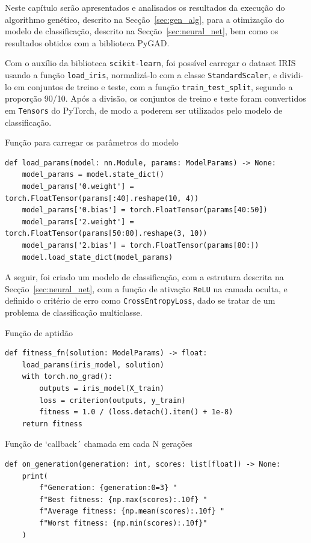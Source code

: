 Neste capítulo serão apresentados e analisados os resultados da execução do algorithmo genético, descrito na Secção~\ref{sec:gen_alg}, para a otimização do modelo de classificação, descrito na Secção~\ref{sec:neural_net}, bem como os resultados obtidos com a biblioteca PyGAD\@.

Com o auxílio da biblioteca \texttt{scikit-learn}, foi possível carregar o dataset IRIS usando a função \texttt{load\_iris}, normalizá-lo com a classe \texttt{StandardScaler}, e dividi-lo em conjuntos de treino e teste, com a função \texttt{train\_test\_split}, segundo a proporção 90/10.
Após a divisão, os conjuntos de treino e teste foram convertidos em \texttt{Tensors} do PyTorch, de modo a poderem ser utilizados pelo modelo de classificação.

\begin{listing}[!ht]
    \caption{Função para carregar os parâmetros do modelo}
    \label{alg:load_params}
    \begin{verbatim}
def load_params(model: nn.Module, params: ModelParams) -> None:
    model_params = model.state_dict()
    model_params['0.weight'] = torch.FloatTensor(params[:40].reshape(10, 4))
    model_params['0.bias'] = torch.FloatTensor(params[40:50])
    model_params['2.weight'] = torch.FloatTensor(params[50:80].reshape(3, 10))
    model_params['2.bias'] = torch.FloatTensor(params[80:])
    model.load_state_dict(model_params)
    \end{verbatim}
\end{listing}

A seguir, foi criado um modelo de classificação, com a estrutura descrita na Secção~\ref{sec:neural_net}, com a função de ativação \texttt{ReLU} na camada oculta,
e definido o critério de erro como \texttt{CrossEntropyLoss}, dado se tratar de um problema de classificação multiclasse.

\begin{listing}[!ht]
    \caption{Função de aptidão}
    \label{alg:fitness_fn}
    \begin{verbatim}
def fitness_fn(solution: ModelParams) -> float:
    load_params(iris_model, solution)
    with torch.no_grad():
        outputs = iris_model(X_train)
        loss = criterion(outputs, y_train)
        fitness = 1.0 / (loss.detach().item() + 1e-8)
    return fitness
    \end{verbatim}
\end{listing}

\begin{listing}[!ht]
    \caption{Função de `callback´ chamada em cada N gerações}
    \label{alg:on_generation}
    \begin{verbatim}
def on_generation(generation: int, scores: list[float]) -> None:
    print(
        f"Generation: {generation:0=3} "
        f"Best fitness: {np.max(scores):.10f} "
        f"Average fitness: {np.mean(scores):.10f} "
        f"Worst fitness: {np.min(scores):.10f}"
    )
    \end{verbatim}
\end{listing}

